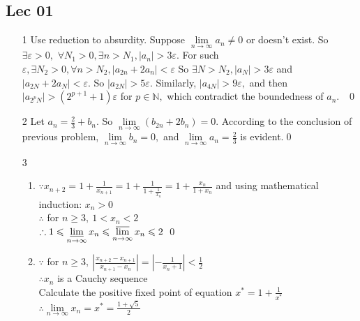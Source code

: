 
\subsection{Lec 01}
\begin{enumerate}[1]
	\item[1]
	Use reduction to absurdity. Suppose \(\lim \limits_{n \rightarrow \infty} a_{n} \neq 0\) or doesn't exist. So \(\exists \varepsilon>0,\)
	\(\forall N_{1}>0, \exists n>N_{1},\left|a_{n}\right|>3 \varepsilon .\) For such \(\varepsilon, \exists N_{2}>0, \forall n>N_{2},\left|a_{2 n}+2 a_{n}\right|<\varepsilon\)
	So \(\exists N>N_{2},\left|a_{N}\right|>3 \varepsilon\) and \(\left|a_{2 N}+2 a_{N}\right|<\varepsilon .\) So \(\left|a_{2 N}\right|>5 \varepsilon .\) Similarly,
	\(\left|a_{4 N}\right|>9 \varepsilon,\) and then \(\left|a_{2^{p} N}\right|>\left(2^{p+1}+1\right) \varepsilon\) for \(p \in \mathbb{N},\) which contradict the boundedness of \(a_{n} .\)
	$\qedhere$ \qed
	
	\item[2]
	Let \(a_{n}=\frac{2}{3}+b_{n} .\) So \(\lim \limits_{n \rightarrow \infty}\left(b_{2 n}+2 b_{n}\right)=0 .\) According to the conclusion of
	previous problem, \(\lim \limits_{n \rightarrow \infty} b_{n}=0,\) and \(\lim \limits_{n \rightarrow \infty} a_{n}=\frac{2}{3}\) is evident.\qed

	\item[3]
\begin{enumerate}[(1)]
	\item 
	\(\because x_{n+2}=1+\frac{1}{x_{n+1}}=1+\frac{1}{1+\frac{1}{x_{n}}}=1+\frac{x_{n}}{1+x_{n}}\) and using mathematical induction: \(x_{n}>0\)\\
	\(\therefore\) for \(n \geqslant 3,\ 1<x_{n}<2\)\\
	\(\therefore 1 \leqslant \varliminf \limits_{n \rightarrow \infty} x_{n} \leqslant \varlimsup \limits_{n \rightarrow \infty} x_{n}  \leqslant 2\) \qed

	\item 
	\(\because\) for \(n \geqslant 3,\ \left|\frac{x_{n+2}-x_{n+1}}{x_{n+1}-x_{n}}\right|=\left|-\frac{1}{x_{n}+1}\right|<\frac{1}{2}\)\\
	\(\therefore x_{n}\) is a Cauchy sequence	\\
	Calculate the positive fixed point of equation \(x^{*}=1+\frac{1}{x^{*}}\)\\
	\(\therefore \lim \limits_{n \rightarrow \infty} x_{n}=x^{*}=\frac{1+\sqrt{5}}{2}\)


\end{enumerate}


\end{enumerate}
